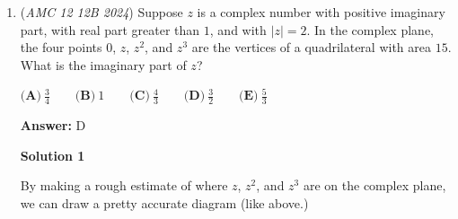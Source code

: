 \begin{enumerate}
 
We can solve this integral using the power-reduction identity: $\sin^2(x) = \frac{1 - \cos(2x)}{2}$
$\frac{180}{89\pi} \int_{\pi/180}^{\pi/2} \frac{1 - \cos(2x)}{2} \, dx$ $= \frac{180}{89\pi} \left.\left(\frac{x}{2} - \frac{\sin(2x)}{4}\right)\right|_{\pi/180}^{\pi/2}$ $= \frac{180}{89\pi} \left[ \left(\frac{\pi}{4} - 0\right) - \left(\frac{\pi}{360} - \frac{\sin\left(\frac{\pi}{90}\right)}{4}\right) \right]$ $= \frac{180}{89\pi} \left( \frac{89\pi}{360} + \frac{\sin\left(\frac{\pi}{90}\right)}{4} \right)$

 
The taylor series of $\sin(\theta) = \theta - \frac{\theta^3}{6} + \frac{\theta^5}{120} - \cdots$

 Because $\sin\left(\frac{\pi}{90}\right)$ is a small angle, we can use a first-order taylor approximation and approximate $\sin\left(\frac{\pi}{90}\right) \approx \frac{\pi}{90}$

 Hence, our result is $\frac{180}{89\pi}\left(\frac{89\pi}{360} + \frac{\pi}{360}\right) = \frac{180}{89\pi}\cdot\frac{90\pi}{360} = \frac{180}{89\pi}\cdot\frac{\pi}{4} = \frac{45}{89}$

 
While $\frac{45}{89}$ isn't an option, it is greater than $\frac{1}{2}$, and out of the given options, only $\frac{91}{180}$ is greater than $\frac{1}{2}$ (We approximated $\sin\left(\frac{\pi}{90}\right)$ with a first-order taylor approximation and calculated the average value over the interval instead of over 90 discrete values, but it's close enough to $\frac{91}{180}$).

 So the answer is $\boxed{\textbf{(E) }\frac{91}{180}}$

 -sourodeepdeb

 


	\item (\textit{AMC 12 12B 2024}) Suppose $z$ is a complex number with positive imaginary part, with real part greater than $1$, and with $|z| = 2$. In the complex plane, the four points $0$, $z$, $z^{2}$, and $z^{3}$ are the vertices of a quadrilateral with area $15$. What is the imaginary part of $z$?


 $\textbf{(A)}~\frac{3}{4}\qquad\textbf{(B)}~1\qquad\textbf{(C)}~\frac{4}{3}\qquad\textbf{(D)}~\frac{3}{2}\qquad\textbf{(E)}~\frac{5}{3}$

 \textbf{Answer: }D



\textbf{Solution 1}

By making a rough estimate of where $z$, $z^2$, and $z^3$ are on the complex plane, we can draw a pretty accurate diagram (like above.) 


\end{enumerate}
